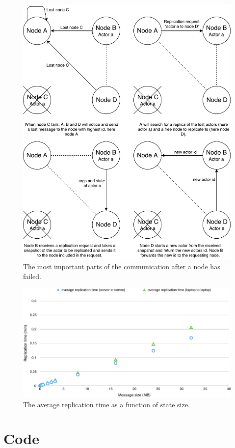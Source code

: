 \documentclass{cslthse-msc}
\begin{document}
\begin{appendices}
\begin{figure}[!hbt]
\centering
\includegraphics[scale=0.5]{images/replication_flow.pdf}
\caption{The most important parts of the communication after a node has failed.} \label{fig:replication_flow}
\end{figure}

\begin{figure}[!hbt]
\centering
\includegraphics[scale=0.5]{images/results/replication_time_less_than_40.pdf} 
\caption{The average replication time as a function of state size.}\label{fig:replication_time_less_than_40}
\end{figure}

\chapter{Code} \label{appendix:code}

\end{appendices}
\end{document}
